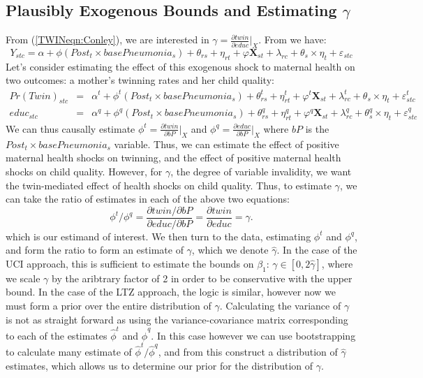 \documentclass[subeqn]{article}
\begin{document}
\begin{spacing}{1.4}
\section{Plausibly Exogenous Bounds and Estimating $\gamma$}
\label{TWINscn:gamma}
From (\ref{TWINeqn:Conley}), we are interested in $\gamma=\frac{\partial twin}{\partial educ}\big|_{X}$.
From \citet{BhalotraVenkataramani2014} we have:
\begin{equation}
Y_{stc} = \alpha + \phi (Post_t\times basePneumonia_s) +\theta_{rs} +\eta_{rt}
+\varphi\mathbf{X}_{st}+\lambda_{rc}+\theta_s\times\eta_t+\varepsilon_{stc}
\end{equation}
Let's consider estimating the effect of this exogenous shock to maternal health
on two outcomes: a mother's twinning rates and her child quality:
\begin{eqnarray}
Pr(Twin)_{stc} &=& \alpha^t + \phi^t (Post_t\times basePneumonia_s) +\theta^t_{rs} +\eta^t_{rt}
+\varphi^t\mathbf{X}_{st}+\lambda^t_{rc}+\theta_s\times\eta_t+\varepsilon^t_{stc} \nonumber \\
educ_{stc} &=& \alpha^q + \phi^q (Post_t\times basePneumonia_s) +\theta^q_{rs} +\eta^q_{rt}
+\varphi^q\mathbf{X}_{st}+\lambda^q_{rc}+\theta^q_s\times\eta_t+\varepsilon^q_{stc} \nonumber
\end{eqnarray}
We can thus causally estimate $\phi^t=\frac{\partial twin}{\partial bP}\big|_{X}$ and
$\phi^q=\frac{\partial educ}{\partial bP}\big|_{X}$ where $bP$ is the $Post_t\times basePneumonia_s$
variable.  Thus, we can estimate the effect of positive maternal health shocks on 
twinning, and the effect of positive maternal health shocks on child quality.
However, for $\gamma$, the degree of variable invalidity, we want the twin-mediated
effect of health shocks on child quality.  Thus, to estimate $\gamma$, we can take
the ratio of estimates in each of the above two equations:
\[
\phi^t/\phi^q=\frac{\partial twin/\partial bP}{\partial educ/\partial bP}=\frac{\partial twin}{\partial educ}=\gamma.
\]
which is our estimand of interest.  We then turn to the data, estimating $\phi^t$ and 
$\phi^q$, and form the ratio to form an estimate of $\gamma$, which we denote $\hat\gamma$.  
In the case of the UCI approach, this is sufficient to estimate the bounds on $\beta_1$: 
$\gamma\in[0,2\hat\gamma]$, where we scale $\gamma$ by the aribtrary factor of 2 in order
to be conservative with the upper bound.  In the case of the LTZ approach, the logic is 
similar, however now we must form a prior over the entire distribution of $\gamma$.
Calculating the variance of $\gamma$ is not as straight forward as using the 
variance-covariance matrix corresponding to each of the estimates $\hat\phi^t$ and 
$\hat\phi^q$.  In this case however we can use bootstrapping to calculate many estimate 
of $\hat\phi^t/\hat\phi^q$, and from this construct a distribution of $\hat\gamma$ 
estimates, which allows us to determine our prior for the distribution of $\gamma$.

\newpage
\end{spacing}
\end{document}
